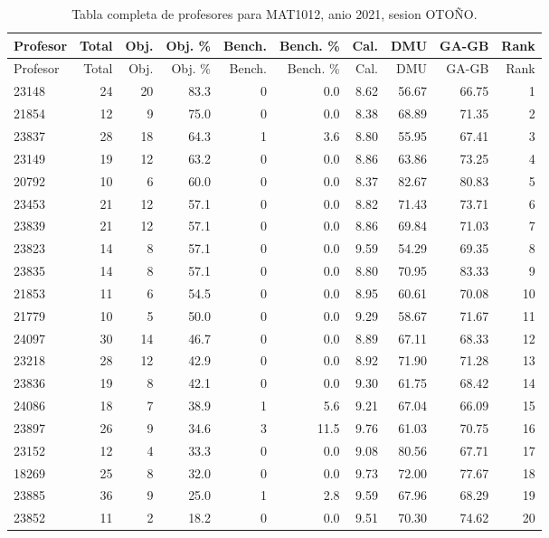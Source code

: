 \begingroup
\scriptsize
\setlength{\tabcolsep}{3pt}
\begin{longtable}{lrrrrrrrrr}
\caption{Tabla completa de profesores para MAT1012, anio 2021, sesion OTOÑO.}\label{tab:prof-period-mat1012-2021-oto-o}\\
\toprule
Profesor & Total & Obj. & Obj. \% & Bench. & Bench. \% & Cal. & DMU & GA-GB & Rank \\
\midrule
\endfirsthead
\toprule
Profesor & Total & Obj. & Obj. \% & Bench. & Bench. \% & Cal. & DMU & GA-GB & Rank \\
\midrule
\endhead
23148 & 24 & 20 & 83.3 & 0 & 0.0 & 8.62 & 56.67 & 66.75 & 1 \\
21854 & 12 & 9 & 75.0 & 0 & 0.0 & 8.38 & 68.89 & 71.35 & 2 \\
23837 & 28 & 18 & 64.3 & 1 & 3.6 & 8.80 & 55.95 & 67.41 & 3 \\
23149 & 19 & 12 & 63.2 & 0 & 0.0 & 8.86 & 63.86 & 73.25 & 4 \\
20792 & 10 & 6 & 60.0 & 0 & 0.0 & 8.37 & 82.67 & 80.83 & 5 \\
23453 & 21 & 12 & 57.1 & 0 & 0.0 & 8.82 & 71.43 & 73.71 & 6 \\
23839 & 21 & 12 & 57.1 & 0 & 0.0 & 8.86 & 69.84 & 71.03 & 7 \\
23823 & 14 & 8 & 57.1 & 0 & 0.0 & 9.59 & 54.29 & 69.35 & 8 \\
23835 & 14 & 8 & 57.1 & 0 & 0.0 & 8.80 & 70.95 & 83.33 & 9 \\
21853 & 11 & 6 & 54.5 & 0 & 0.0 & 8.95 & 60.61 & 70.08 & 10 \\
21779 & 10 & 5 & 50.0 & 0 & 0.0 & 9.29 & 58.67 & 71.67 & 11 \\
24097 & 30 & 14 & 46.7 & 0 & 0.0 & 8.89 & 67.11 & 68.33 & 12 \\
23218 & 28 & 12 & 42.9 & 0 & 0.0 & 8.92 & 71.90 & 71.28 & 13 \\
23836 & 19 & 8 & 42.1 & 0 & 0.0 & 9.30 & 61.75 & 68.42 & 14 \\
24086 & 18 & 7 & 38.9 & 1 & 5.6 & 9.21 & 67.04 & 66.09 & 15 \\
23897 & 26 & 9 & 34.6 & 3 & 11.5 & 9.76 & 61.03 & 70.75 & 16 \\
23152 & 12 & 4 & 33.3 & 0 & 0.0 & 9.08 & 80.56 & 67.71 & 17 \\
18269 & 25 & 8 & 32.0 & 0 & 0.0 & 9.73 & 72.00 & 77.67 & 18 \\
23885 & 36 & 9 & 25.0 & 1 & 2.8 & 9.59 & 67.96 & 68.29 & 19 \\
23852 & 11 & 2 & 18.2 & 0 & 0.0 & 9.51 & 70.30 & 74.62 & 20 \\

\end{longtable}
